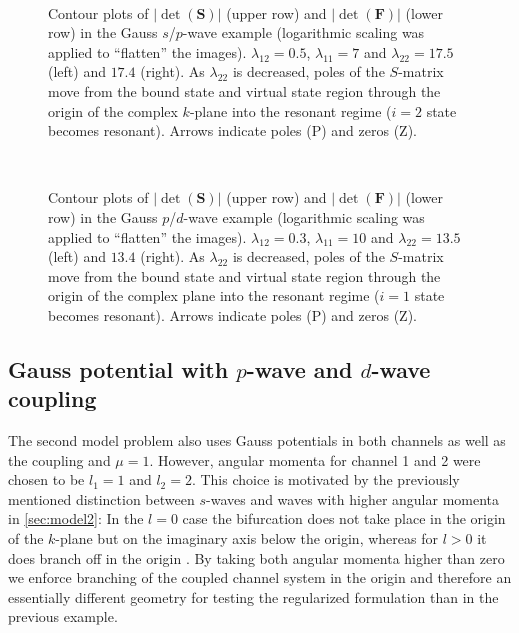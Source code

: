 \documentclass[mathpazo]{cicp}
\begin{document}
\begin{figure}[h!]
	\centering
	\begin{minipage}[t]{0.45\linewidth}
		\centering
		\subfigure{\texttt{[image: 17\_5\_ds]}}
		\subfigure{\texttt{[image: 17\_4\_ds]}}\\
		\caption{Contour plots of $|\det(\mathbold{S})|$ (upper row) and $|\det(\mathbold{F})|$ (lower row) in the Gauss $s$/$p$-wave example (logarithmic scaling was applied to ``flatten'' the images). $\lambda_{12}=0.5$, $\lambda_{11}=7$ and $\lambda_{22}=17.5$ (left) and $17.4$ (right). As $\lambda_{22}$ is decreased, poles of the $S$-matrix move from the bound state and virtual state region through the origin of the complex $k$-plane into the resonant regime ($i=2$ state becomes resonant). Arrows indicate poles (P) and zeros (Z).}
		\label{fig:gauss_l0_l1_c05_smatrix}
	\end{minipage}
	\hspace{0.5cm}
	\begin{minipage}[t]{0.45\linewidth}
		\centering
		\subfigure{\texttt{[image: 13\_5\_ds]}}
		\subfigure{\texttt{[image: 13\_4\_ds]}}\\
		\caption{Contour plots of $|\det(\mathbold{S})|$ (upper row) and $|\det(\mathbold{F})|$ (lower row) in the Gauss $p$/$d$-wave example (logarithmic scaling was applied to ``flatten'' the images). $\lambda_{12}=0.3$, $\lambda_{11}=10$ and $\lambda_{22}=13.5$ (left) and $13.4$ (right). As $\lambda_{22}$ is decreased, poles of the $S$-matrix move from the bound state and virtual state region through the origin of the complex plane into the resonant regime ($i=1$ state becomes resonant). Arrows indicate poles (P) and zeros (Z).}
		\label{fig:gauss_l1_l2_c03_smatrix}
	\end{minipage}
\end{figure}

\subsection{Gauss potential with $p$-wave and $d$-wave coupling}
\label{sec:model3}
The second model problem also uses Gauss potentials in both channels as well as the coupling and $\mu=1$. However, angular momenta for channel 1 and 2 were chosen to be $l_{1}=1$ and $l_{2}=2$. This choice is motivated by the previously mentioned distinction between $s$-waves and waves with higher angular momenta in \ref{sec:model2}: In the $l=0$ case the bifurcation does not take place in the origin of the $k$-plane but on the imaginary axis below the origin, whereas for $l>0$ it does branch off in the origin \cite{Taylor2006}. By taking both angular momenta higher than zero we enforce branching of the coupled channel system in the origin and therefore an essentially different geometry for testing the regularized formulation than in the previous example.
\end{document}
